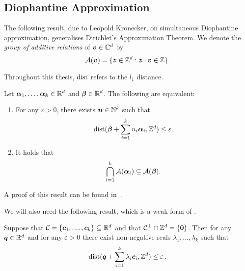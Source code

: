 \subsection{Diophantine Approximation}

The following result, due to Leopold Kronecker, on simultaneous Diophantine approximation, generalises Dirichlet's Approximation Theorem. We denote the \emph{group of additive relations} of $\boldsymbol{v} \in \mathbb{C}^{d}$ by
\begin{align*}
{\cal{A}}(\boldsymbol{v}) = \lbrace \boldsymbol{z} \in \mathbb{Z}^{d} : \boldsymbol{z} \cdot \boldsymbol{v} \in \mathbb{Z} \rbrace .
\end{align*}

Throughout this thesis, $\operatorname{dist}$ refers to the $l_{1}$ distance.

\begin{theorem}[Kronecker]
\label{thm:Kronecker}
Let $\boldsymbol{\alpha}_{1}, \ldots, \boldsymbol{\alpha_{k}} \in \mathbb{R}^{d}$ and $\boldsymbol{\beta} \in \mathbb{R}^{d}$. The following are equivalent:
\begin{enumerate}
\item For any $\varepsilon > 0$, there exists $\boldsymbol{n} \in \mathbb{N}^{k}$ such that
\begin{align*}
\operatorname{dist}(\boldsymbol{\beta} + \sum\limits_{i=1}^{k} n_{i} \boldsymbol{\alpha}_{i}, \mathbb{Z}^{d}) \leq \varepsilon .
\end{align*}
\item It holds that
\begin{align*}
\bigcap\limits_{i=1}^{k} {\cal{A}}(\boldsymbol{\alpha}_{i}) \subseteq {\cal{A}}(\boldsymbol{\beta}) .
\end{align*}
\end{enumerate}
\end{theorem}

A proof of this result can be found in~\cite{Cassels}.

We will also need the following result, which is a weak form of \cite[Corollary 2.8]{KhachiyanP97}.

\begin{theorem}
  \label{thm:kp-density}
  Suppose that $\mathcal{C} = \lbrace \boldsymbol{c}_{1}, \ldots, \boldsymbol{c}_{k} \rbrace \subseteq \mathbb{R}^{d}$ and that $\mathcal{C}^{\perp} \cap \mathbb{Z}^{d} = \lbrace \boldsymbol{0} \rbrace$. Then for any $\boldsymbol{q} \in \mathbb{R}^{d}$
  and for any $\varepsilon > 0$ there exist non-negative reals $\lambda_{1}, \ldots, \lambda_{k}$ such that
  \begin{equation*}
    \operatorname{dist}(\boldsymbol{q} + \sum\limits_{i=1}^{k} \lambda_{i} \boldsymbol{c}_{i}, \mathbb{Z}^{d}) \leq \varepsilon \, .
  \end{equation*}
\end{theorem}
